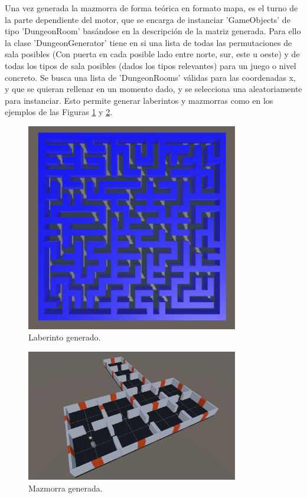 Una vez generada la mazmorra de forma teórica en formato mapa, es el turno de la parte dependiente del motor, que se encarga de instanciar 'GameObjects' de tipo 'DungeonRoom' 
basándose en la descripción de la matriz generada. Para ello la clase 'DungeonGenerator' tiene en si una lista de todas las permutaciones de sala posibles (Con puerta en cada 
posible lado entre norte, sur, este u oeste) y de todas los tipos de sala posibles (dados los tipos relevantes) para un juego o nivel concreto. Se busca una lista de 
'DungeonRooms' válidas para las coordenadas x, y que se quieran rellenar en un momento dado, y se selecciona una aleatoriamente para instanciar. Esto permite generar laberintos
y mazmorras como en los ejemplos de las Figuras \ref{fig:labyrinthExample} y \ref{fig:dungeonExample}.

\begin{figure}[H]
  \centering
    \includegraphics[width=350px,clip=true]{labyrinth_example.png}
  \caption{Laberinto generado.}
  \label{fig:labyrinthExample}
\end{figure}

\begin{figure}[H]
  \centering
    \includegraphics[width=350px,clip=true]{DungeonExample.png}
  \caption{Mazmorra generada.}
  \label{fig:dungeonExample}
\end{figure}

